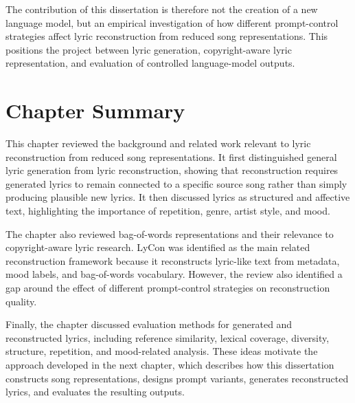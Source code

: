 The contribution of this dissertation is therefore not the creation of a new language model, but an empirical investigation of how different prompt-control strategies affect lyric reconstruction from reduced song representations. This positions the project between lyric generation, copyright-aware lyric representation, and evaluation of controlled language-model outputs.

\section{Chapter Summary}

This chapter reviewed the background and related work relevant to lyric reconstruction from reduced song representations. It first distinguished general lyric generation from lyric reconstruction, showing that reconstruction requires generated lyrics to remain connected to a specific source song rather than simply producing plausible new lyrics. It then discussed lyrics as structured and affective text, highlighting the importance of repetition, genre, artist style, and mood.

The chapter also reviewed bag-of-words representations and their relevance to copyright-aware lyric research. LyCon was identified as the main related reconstruction framework because it reconstructs lyric-like text from metadata, mood labels, and bag-of-words vocabulary. However, the review also identified a gap around the effect of different prompt-control strategies on reconstruction quality.

Finally, the chapter discussed evaluation methods for generated and reconstructed lyrics, including reference similarity, lexical coverage, diversity, structure, repetition, and mood-related analysis. These ideas motivate the approach developed in the next chapter, which describes how this dissertation constructs song representations, designs prompt variants, generates reconstructed lyrics, and evaluates the resulting outputs.

